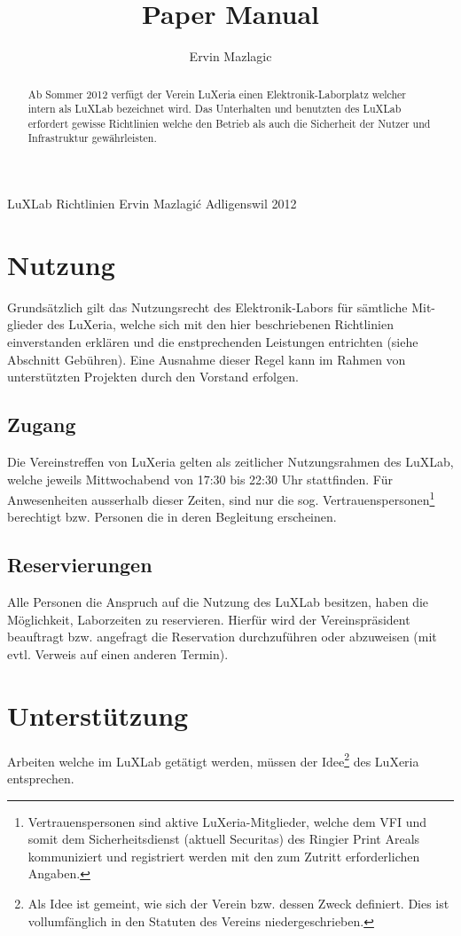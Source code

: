 \documentclass[a4paper,
               10pt,
               fleqn]{article}
\author{Ervin Mazlagic}
\title{Paper Manual}
\begin{document}
         {LuXLab Richtlinien}
         {Ervin Mazlagi\'c}
         {Adligenswil}
         {2012}
         
\begin{abstract}
\noindent
Ab Sommer 2012 verfügt der Verein LuXeria einen Elektronik-Laborplatz
welcher intern als LuXLab bezeichnet wird. Das Unterhalten und benutzten 
des LuXLab erfordert gewisse Richtlinien welche den Betrieb als auch
die Sicherheit der Nutzer und Infrastruktur gewährleisten.
\end{abstract}

\newpage

\tableofcontents
\newpage


\section{Nutzung}
Grundsätzlich gilt das Nutzungsrecht des Elektronik-Labors für sämtliche Mit-
glieder des LuXeria, welche sich mit den hier beschriebenen Richtlinien 
einverstanden erklären und die enstprechenden Leistungen entrichten 
(siehe Abschnitt Gebühren). Eine Ausnahme dieser Regel kann im Rahmen 
von unterstützten Projekten durch den Vorstand erfolgen.

\subsection{Zugang}
Die Vereinstreffen von LuXeria gelten als zeitlicher Nutzungsrahmen 
des LuXLab, welche jeweils Mittwochabend von 17:30 bis 22:30 Uhr 
stattfinden. Für Anwesenheiten ausserhalb dieser Zeiten, sind nur die sog. Vertrauenspersonen\footnote{Vertrauenspersonen sind aktive LuXeria-Mitglieder,
    welche dem VFI und somit dem Sicherheitsdienst (aktuell Securitas) des
    Ringier Print Areals kommuniziert und registriert werden mit den zum
    Zutritt erforderlichen Angaben.}
berechtigt bzw. Personen die in deren Begleitung erscheinen.

\subsection{Reservierungen}
Alle Personen die Anspruch auf die Nutzung des LuXLab besitzen, haben die
Möglichkeit, Laborzeiten zu reservieren. Hierfür wird der Vereinspräsident 
beauftragt bzw. angefragt die Reservation durchzuführen oder abzuweisen
(mit evtl. Verweis auf einen anderen Termin).

\section{Unterstützung}
Arbeiten welche im LuXLab getätigt werden, müssen der Idee\footnote{
     Als Idee ist gemeint, wie sich der Verein bzw. dessen Zweck definiert.
     Dies ist vollumfänglich in den Statuten des Vereins niedergeschrieben.}
des LuXeria entsprechen. 
\end{document}
